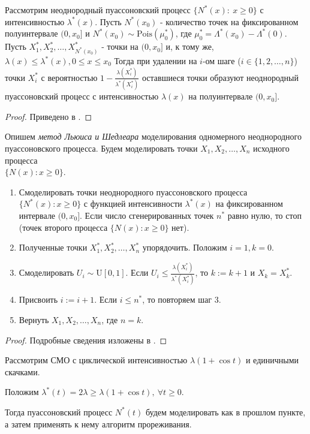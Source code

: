 \documentclass[11pt]{report}
\begin{document}
\begin{theorem}
Рассмотрим неоднородный пуассоновский процесс $\{N^*(x):~x\geqslant0 \}$ с интенсивностью $\lambda^*(x)$. Пусть $N^*(x_0)$ - количество точек на фиксированном полуинтервале $(0,x_0]$ и $N^*(x_0)\sim\mathrm{Pois}(\mu^*_0)$, где $\mu^*_0=\Lambda^*(x_0) - \Lambda^*(0)$. Пусть $X_1^*,X_2^*,\dots,X^*_{N^*(x_0)}$ - точки на $(0,x_0]$ и, к тому же, $\lambda(x)\leqslant\lambda^*(x),0\leqslant x\leqslant x_0$  Тогда при удалении на $i$-ом шаге ($i\in\{1,2,\dots,n\}$) точки $X^*_i$ с вероятностью $1-\frac{\lambda(X_i^*)}{\lambda^*(X_i^*)}$ оставшиеся точки образуют неоднородный пуассоновский процесс с интенсивностью $\lambda(x)$ на полуинтервале $(0,x_0]$.
\end{theorem}
\begin{proof}
Приведено в \cite{ostrem}.
\end{proof}

Опишем \textit{метод Льюиса и Шедлеара} моделирования одномерного неоднородного пуассоновского процесса. Будем моделировать точки $X_1,X_2,\dots,X_n$ исходного процесса \\
$\{N(x):x\geqslant0\}$.
\begin{enumerate}
\item Смоделировать точки неоднородного пуассоновского процесса $\{N^*(x): x\geqslant0\}$ с функцией интенсивности $\lambda^*(x)$ на фиксированном интервале $(0,x_0]$. Если число сгенерированных точек $n^*$ равно нулю, то стоп (точек второго процесса $\{N(x):x\geqslant0\}$ нет).
\item Полученные точки $X_1^*,X_2^*,\dots,X_n^*$ упорядочить. Положим $i=1,k=0$.
\item Смоделировать $U_i\sim\mathrm{U}[0,1]$. Если $U_i\leqslant\frac{\lambda(X_i^*)}{\lambda^*(X_i^*)}$, то $k:=k+1$ и $X_k = X^*_k$.
\item Присвоить $i:=i+1$. Если $i\leqslant n^*$, то повторяем шаг 3.
\item Вернуть $X_1,X_2,\dots,X_n$, где $n=k$.
\end{enumerate}
\begin{proof}
Подробные сведения изложены в \cite{lewis}.
\end{proof}

Рассмотрим СМО с циклической интенсивностью $\lambda(1+\cos t)$ и единичными скачками.

Положим $\lambda^*(t) = 2\lambda \geqslant \lambda(1+\cos t),~ \forall t\geqslant0$.

Тогда пуассоновский процесс $N^*(t)$ будем моделировать как в прошлом пункте, а затем применять к нему алгоритм прореживания.
\end{document}
